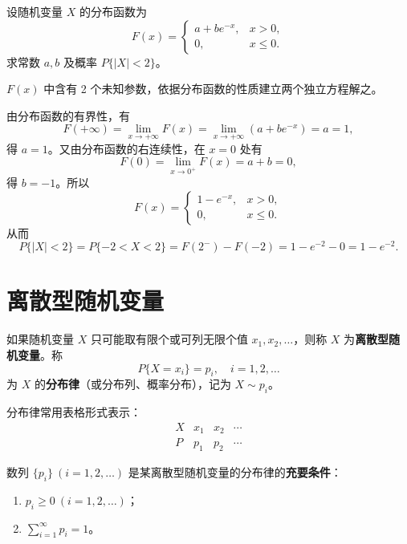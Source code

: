 ﻿\documentclass[lang=cn,11pt]{elegantbook}
\begin{document}
\begin{exercise}\label{exer:2-3}
设随机变量 \(X\) 的分布函数为
\[
F(x) = \begin{cases}
a + b e^{-x}, & x > 0, \\
0, & x \le 0.
\end{cases}
\]
求常数 \(a, b\) 及概率 \(P\{|X| < 2\}\)。
\end{exercise}

\begin{solution}
\(F(x)\) 中含有 2 个未知参数，依据分布函数的性质建立两个独立方程解之。

由分布函数的有界性，有
\[
F(+\infty) = \lim_{x \to +\infty} F(x) = \lim_{x \to +\infty} (a + b e^{-x}) = a = 1,
\]
得 \(a = 1\)。又由分布函数的右连续性，在 \(x=0\) 处有
\[
F(0) = \lim_{x \to 0^+} F(x) = a + b = 0,
\]
得 \(b = -1\)。所以
\[
F(x) = \begin{cases}
1 - e^{-x}, & x > 0, \\
0, & x \le 0.
\end{cases}
\]
从而
\[
P\{|X| < 2\} = P\{-2 < X < 2\} = F(2^-) - F(-2) = 1 - e^{-2} - 0 = 1 - e^{-2}.
\]
\end{solution}

\section{离散型随机变量}

\begin{definition}[离散型随机变量] \label{def:discrete-rv}
如果随机变量 $X$ 只可能取有限个或可列无限个值 $x_1, x_2, \dots$，则称 $X$ 为\textbf{离散型随机变量}。称
\[
P\{X = x_i\} = p_i, \quad i = 1, 2, \dots
\]
为 $X$ 的\textbf{分布律}（或分布列、概率分布），记为 $X \sim p_i$。
\end{definition}

分布律常用表格形式表示：
\[
\begin{array}{c|cccc}
X & x_1 & x_2 & \cdots \\
\hline
P & p_1 & p_2 & \cdots
\end{array}
\]

\begin{property}\label{prop:discrete-rv-condition}
数列 $\{p_i\}\ (i=1,2,\dots)$ 是某离散型随机变量的分布律的\textbf{充要条件}：
\begin{enumerate}
    \item $p_i \ge 0\ (i = 1, 2, \dots)$；
    \item $\displaystyle\sum_{i=1}^{\infty} p_i = 1$。
\end{enumerate}
\end{property}
\end{document}
